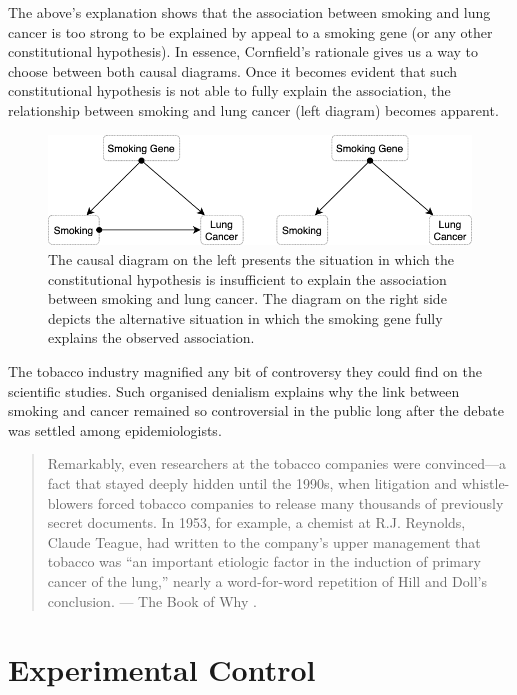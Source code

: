 \documentclass[
]{book}
\begin{document}
The above's explanation shows that the association between smoking and lung cancer is too strong to be explained by appeal to a smoking gene (or any other constitutional hypothesis). In essence, Cornfield's rationale gives us a way to choose between both causal diagrams. Once it becomes evident that such constitutional hypothesis is not able to fully explain the association, the relationship between smoking and lung cancer (left diagram) becomes apparent.

\begin{figure}

{\centering \includegraphics[width=0.7\linewidth]{Figures/SmokeDebate_diagram} 

}

\caption{The causal diagram on the left presents the situation in which the constitutional hypothesis is insufficient to explain the association between smoking and lung cancer. The diagram on the right side depicts the alternative situation in which the smoking gene fully explains the observed association.}\label{fig:smoke-debate-dia}
\end{figure}

The tobacco industry magnified any bit of controversy they could find on the scientific studies. Such organised denialism explains why the link between smoking and cancer remained so controversial in the public long after the debate was settled among epidemiologists.

\begin{quote}
Remarkably, even researchers at the tobacco companies were convinced---a fact that stayed deeply hidden until the 1990s, when litigation and whistle-blowers forced tobacco companies to release many thousands of previously secret documents. In 1953, for example, a chemist at R.J. Reynolds, Claude Teague, had written to the company's upper management that tobacco was ``an important etiologic factor in the induction of primary cancer of the lung,'' nearly a word-for-word repetition of Hill and Doll's conclusion. --- The Book of Why \citep{book-of-why}.
\end{quote}

\hypertarget{experimental-control}{%
\section{Experimental Control}\label{experimental-control}}
\end{document}
